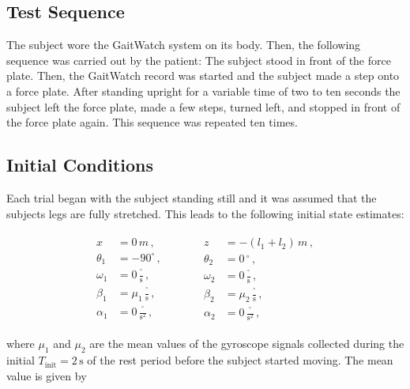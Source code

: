 \subsection{Test Sequence}

The subject wore the GaitWatch system on its body. Then, the following sequence was carried out by the patient: The subject stood in front of the force plate. Then, the GaitWatch record was started and the subject made a step onto a force plate. After standing upright for a variable time of two to ten seconds the subject left the force plate, made a few steps, turned left, and stopped in front of the force plate again. This sequence was repeated ten times.

\subsection{Initial Conditions}

Each trial began with the subject standing still and it was assumed that the subjects legs are fully stretched. This leads to the following initial state estimates:

\begin{equation}
\begin{matrix}
	\begin{split}
	  x &= 0\,m\,, \\
	  \theta_1 &= -90^{\circ}\,, \\
	  \omega_1 &= 0\,\frac{^{\circ}}{\mbox{s}}\,, \\
	  \beta_1 &= \mu_1\,\frac{^{\circ}}{\mbox{s}}\,, \\
	  \alpha_1 &= 0\,\frac{^{\circ}}{\mbox{s}^2}\,,
\end{split} \qquad \quad
    \begin{split}
   	  z &= -(l_1+l_2)\,m\,, \\
	  \theta_2 &= 0\,^{\circ}\,, \mathrel{\phantom{90^{\circ}}}\\
	  \omega_2 &= 0\,\frac{^{\circ}}{\mbox{s}}\,, \\
	  \beta_2 &= \mu_2\,\frac{^{\circ}}{\mbox{s}}\,, \\
	  \alpha_2 &= 0\,\frac{^{\circ}}{\mbox{s}^2}\,,  
\end{split}
\end{matrix}
\end{equation}

\noindent
where $\mu_1$ and $\mu_2$ are the mean values of the gyroscope signals collected during the initial $T_{\text{init}} = 2\,\mbox{s}$ of the rest period before the subject started moving. The mean value is given by

